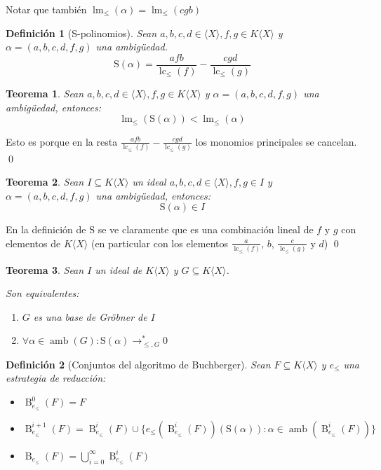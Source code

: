 \documentclass{report}
\theoremstyle{customstyle}
\newtheorem{definition}{Definición}[chapter]
\newtheorem{theorem}{Teorema}[chapter]
\renewenvironment{proof}[1][\proofname]{{\bfseries #1: }}{\qed} %
\theoremstyle{factstyle}
\DeclareMathOperator{\lm}{lm}
\DeclareMathOperator{\lc}{lc}
\DeclareMathOperator{\amb}{amb}
\renewcommand{\S}{\text{S}}
\DeclareMathOperator{\B}{B}
\begin{document}
Notar que también $\lm_≤{(α)} = \lm_≤{(cgb)}$

\begin{definition}[S-polinomios]
Sean $a, b, c, d ∈ ⟨X⟩, f, g ∈ K⟨X⟩$ y $α = (a, b, c, d, f, g)$ una ambigüedad.
\[ \S(α) = \frac{afb}{\lc_≤{(f)}} - \frac{cgd}{\lc_≤{(g)}} \]
\end{definition}

\begin{theorem}
Sean $a, b, c, d ∈ ⟨X⟩, f, g ∈ K⟨X⟩$ y $α = (a, b, c, d, f, g)$ una ambigüedad, entonces:
\[ \lm_≤{(\S(α))} < \lm_≤{(α)} \]
\end{theorem}
\begin{proof}
Esto es porque en la resta $\frac{afb}{\lc_≤{(f)}} - \frac{cgd}{\lc_≤{(g)}}$ los monomios principales se cancelan.
\end{proof}

\begin{theorem}\label{thm:S es cerrado en ideal}
Sean $I ⊆ K⟨X⟩$ un ideal $a, b, c, d ∈ ⟨X⟩, f, g ∈ I$ y $α = (a, b, c, d, f, g)$ una ambigüedad, entonces:
\[ \S(α) ∈ I \]
\end{theorem}
\begin{proof}
En la definición de $\S$ se ve claramente que es una combinación lineal de $f$ y $g$ con elementos de $K⟨X⟩$ (en particular con los elementos $\frac{a}{\lc_≤{(f)}}$, $b$, $\frac{c}{\lc_≤{(g)}}$ y $d$)
\end{proof}

\begin{theorem}\label{thm:equivalencias de base de Gröbner (con ambs)}
Sean $I$ un ideal de $K⟨X⟩$ y $G ⊆ K⟨X⟩$.

Son equivalentes:
\begin{enumerate}
\item $G$ es una base de Gröbner de $I$

\item $∀α ∈ \amb(G) : \S(α) →^*_{≤, G} 0$

\end{enumerate}
\end{theorem}


\begin{definition}[Conjuntos del algoritmo de Buchberger]
Sean $F ⊆ K⟨X⟩$ y $e_≤$ una estrategia de reducción:
\begin{itemize}
\item $\B_{e_≤}^0(F) = F$
\item $\B_{e_≤}^{i + 1}(F) = \B_{e_≤}^i(F) ∪ \{e_≤(\B_{e_≤}^i(F))(\S(α)) : α ∈ \amb(\B_{e_≤}^i(F))\}$
\item $\B_{e_≤}(F) = ⋃_{i = 0}^∞ \B_{e_≤}^i(F)$
\end{itemize}
\end{definition}
\end{document}
